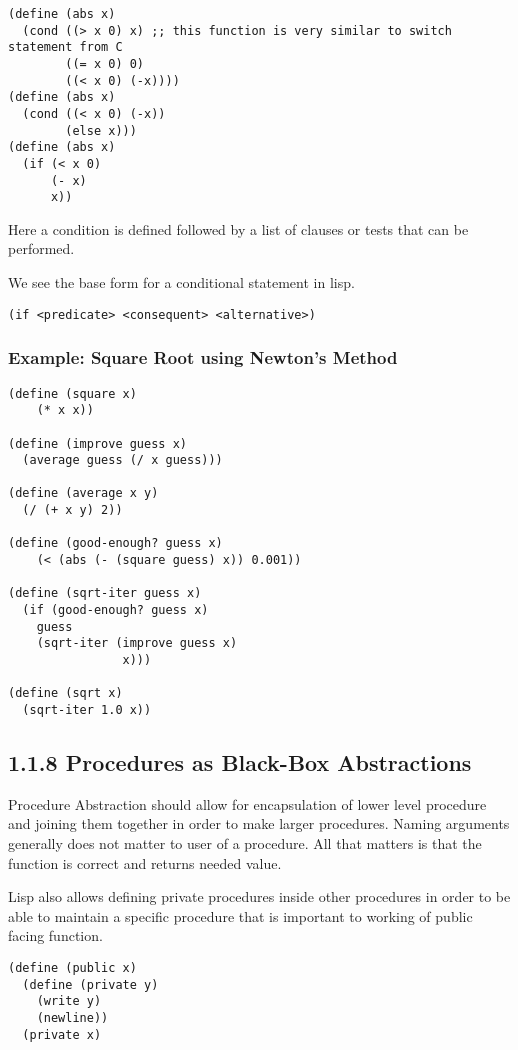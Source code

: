 \documentclass[11pt]{article}
\begin{document}
\begin{verbatim}
(define (abs x)
  (cond ((> x 0) x) ;; this function is very similar to switch statement from C
        ((= x 0) 0)
        ((< x 0) (-x))))
(define (abs x)
  (cond ((< x 0) (-x))
        (else x)))
(define (abs x)
  (if (< x 0)
      (- x)
      x))
\end{verbatim}

Here a condition is defined followed by a list of clauses or tests that
can be performed.

We see the base form for a conditional statement in lisp.

\begin{verbatim}
(if <predicate> <consequent> <alternative>)
\end{verbatim}

\subsubsection{Example: Square Root using Newton's Method}
\label{sec:orgb19a491}
\begin{verbatim}
(define (square x)
    (* x x))

(define (improve guess x)
  (average guess (/ x guess)))

(define (average x y)
  (/ (+ x y) 2))

(define (good-enough? guess x)
    (< (abs (- (square guess) x)) 0.001))

(define (sqrt-iter guess x)
  (if (good-enough? guess x)
    guess
    (sqrt-iter (improve guess x)
                x)))

(define (sqrt x)
  (sqrt-iter 1.0 x))
\end{verbatim}

\subsection{1.1.8 Procedures as Black-Box Abstractions}
\label{sec:orge028c92}
Procedure Abstraction should allow for encapsulation of lower level
procedure and joining them together in order to make larger procedures.
Naming arguments generally does not matter to user of a procedure. All
that matters is that the function is correct and returns needed value.

Lisp also allows defining private procedures inside other procedures in
order to be able to maintain a specific procedure that is important to
working of public facing function.

\begin{verbatim}
(define (public x)
  (define (private y)
    (write y)
    (newline))
  (private x)
\end{verbatim}
\end{document}
